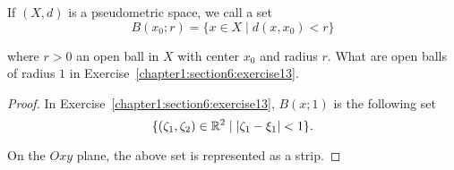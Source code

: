 \begin{exercise}\label{chapter1:section6:exercise15}
    If $(X, d)$ is a pseudometric space, we call a set
    \[
        B(x_{0}; r) = \{ x\in X \mid d(x, x_{0}) < r \}
    \]

    where $r > 0$ an open ball in $X$ with center $x_{0}$ and radius $r$. What are open balls of radius $1$ in Exercise~\ref{chapter1:section6:exercise13}.
\end{exercise}

\begin{proof}
    In Exercise~\ref{chapter1:section6:exercise13}, $B(x; 1)$ is the following set
    \[
        \{ (\zeta_{1}, \zeta_{2})\in \mathbb{R}^{2} \mid \left\vert{\zeta_{1} - \xi_{1}}\right\vert < 1 \}.
    \]

    On the $Oxy$ plane, the above set is represented as a strip.
\end{proof}
